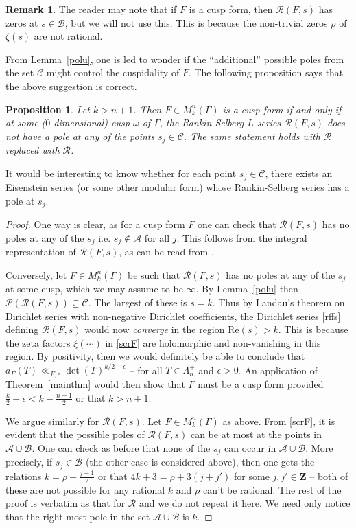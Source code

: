 \documentclass[12pt]{amsart}
\numberwithin{equation}{section}
\theoremstyle{plain}
\newtheorem{prop}[thm]{Proposition}
\newcommand{\thmref}[1]{Theorem~\ref{#1}}
\newcommand{\lemref}[1]{Lemma~\ref{#1}}
\theoremstyle{definition}
\newtheorem{rmk}[thm]{Remark}
\newcommand{\z}{\mf Z}
\newcommand{\re}{\mrm{Re}}
\newcommand{\mf}{\mathbf}
\newcommand{\mc}{\mathcal}
\newcommand{\mrm}{\mathrm}
\newcommand{\mcr}{\mathscr}
\newcommand{\mkngam}{M^n_k(\Gamma)}
\begin{document}
\begin{rmk}
    The reader may note that if $F$ is a cusp form, then $\mc R(F,s)$ has zeros at $s \in \mcr B$, but we will not use this. This is because the non-trivial zeros $\rho$ of $\zeta(s)$ are not rational. 
\end{rmk}

From Lemma~\ref{polu}, one is led to wonder if the ``additional'' possible poles from the set $\mcr C$ might control the cuspidality of $F$. The following proposition says that the above suggestion is correct.

\begin{prop} \label{propole}
    Let $k>n+1$. Then $F \in \mkngam$ is a cusp form if and only if  at some ($0$-dimensional) cusp $\omega$ of $\Gamma$, the Rankin-Selberg $L$-series $\mc R(F,s)$ does not have a pole at any of the points $s_j \in \mcr C$. The same statement holds with $\mc R$ replaced with $\mcr R$.
\end{prop}
 It would be interesting to know whether for each point $s_j \in \mcr C$, there exists an Eisenstein series (or some other modular form) whose Rankin-Selberg series has a pole at $s_j$.

\begin{proof}
One way is clear, as for a  cusp form $F$ one can check that $\mcr R(F,s)$ has no poles at any of the $s_j$ i.e. $s_j \not \in \mcr A$ for all $j$. This follows from the integral representation of $\mc R(F,s)$, as can be read from \cite[Theorem 2]{kalinin}. 

Conversely, let $F \in \mkngam$ be such that $\mc R(F,s)$ has no poles at any of the $s_j$ at some cusp, which we may assume to be $\infty$. By \lemref{polu} then $\mathscr{P}(\mc R(F,s)) \subseteq \mcr C$. The largest of these is $s=k$. Thus by Landau's theorem on Dirichlet series with non-negative Dirichlet coefficients, the Dirichlet series \eqref{rffs} defining $\mc R(F,s)$ would now \textsl{converge} in the region $\re(s)>k$. This is because the zeta factors $\xi(\cdots)$ in \eqref{scrF} are holomorphic and non-vanishing in this region.
By positivity, then we would definitely be able to conclude that $\displaystyle a_F(T) \ll_{F,\epsilon} \det(T)^{k/2 +\epsilon}$ --  for all $T \in \Lambda^+_n$ and $\epsilon>0$. An application of \thmref{mainthm} would then show that  
 $F$ must be a cusp form provided $\displaystyle \frac{k}{2}+\epsilon < k - \frac{n+1}{2}$ or that $k>n+1$.

We argue similarly for $\mcr R(F,s)$. Let $F \in \mkngam$ as above. From \eqref{scrF}, it is evident that the possible poles of $\mcr  R(F,s)$ can be at most at the points in $\mcr A \cup \mcr B$.  One can check as before that none of the $s_j$ can occur in $\mcr A \cup \mcr B$. More precisely, if $s_j \in  \mcr B$ (the other case is considered above), then one gets the relations $k = \rho + \frac{j-1}{2}$ or that $4k +3 = \rho +3(j+j')$ for some $j,j' \in \z$ -- both of these are not possible for any rational $k$ and $\rho$ can't be rational. The rest of the proof is verbatim as that for $\mc R$ and we do not repeat it here. We need only notice that the right-most pole in the set $\mathscr{A}  \cup \mathscr{B} $ is $k$.
\end{proof}
\end{document}
